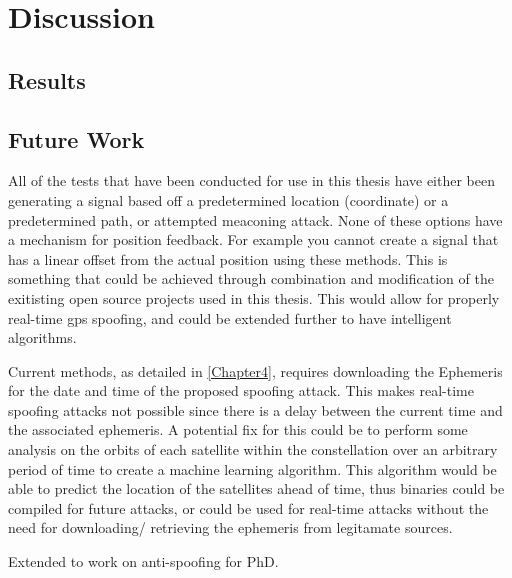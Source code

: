 
\chapter{Discussion} %

\label{Chapter6} %


\section{Results}

\section{Future Work}
All of the tests that have been conducted for use in this thesis have either been generating a signal based off a predetermined location (coordinate) or a predetermined
path, or attempted meaconing attack. None of these options have a mechanism for position feedback. For example you cannot create a signal that has a linear offset from
the actual position using these methods. This is something that could be achieved through combination and modification of the exitisting open source projects used in this
thesis. This would allow for properly real-time gps spoofing, and could be extended further to have intelligent algorithms.

Current methods, as detailed in \ref{Chapter4}, requires downloading the Ephemeris for the date and time of the proposed spoofing attack. This makes real-time spoofing
attacks not possible since there is a delay between the current time and the associated ephemeris. A potential fix for this could be to perform some analysis on the
orbits of each satellite within the constellation over an arbitrary period of time to create a machine learning algorithm. This algorithm would be able to predict the
location of the satellites ahead of time, thus binaries could be compiled for future attacks, or could be used for real-time attacks without the need for downloading/
retrieving the ephemeris from legitamate sources.

Extended to work on anti-spoofing for PhD.